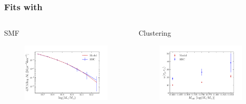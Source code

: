 \documentclass[t]{beamer}
\begin{document}
\begin{frame}
    \frametitle{Fits with \Mhalo{}}

    \begin{columns}

    \begin{block}{SMF}
        \begin{figure}
        \includegraphics[width=\textwidth]{images/fit_smf_mhalo.png}
        \end{figure}
    \end{block}


    \begin{block}{Clustering}
        \begin{figure}
        \includegraphics[width=\textwidth]{images/fit_clust_mhalo.png}
        \end{figure}
    \end{block}
    \end{columns}
\end{frame}
\end{document}
